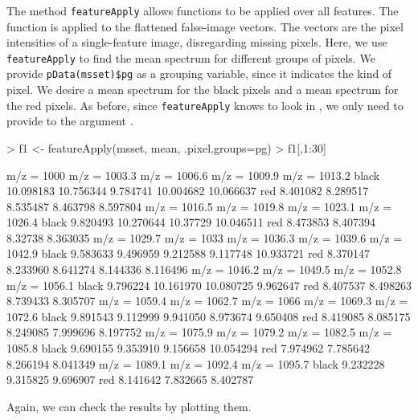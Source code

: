 \documentclass[a4paper]{article}
\begin{document}
\subsubsection{}

The method \verb|featureApply| allows functions to be applied over all features. The function is applied to the flattened false-image vectors. The vectors are the pixel intensities of a single-feature image, disregarding missing pixels. Here, we use \verb|featureApply| to find the mean spectrum for different groups of pixels. We provide \verb|pData(msset)$pg| as a grouping variable, since it indicates the kind of pixel. We desire a mean spectrum for the black pixels and a mean spectrum for the red pixels. As before, since \verb|featureApply| knows to look in , we only need to provide  to the argument .
\begin{Schunk}
\begin{Sinput}
> f1 <- featureApply(msset, mean, .pixel.groups=pg)
> f1[,1:30]
\end{Sinput}
\begin{Soutput}
      m/z = 1000 m/z = 1003.3 m/z = 1006.6 m/z = 1009.9 m/z = 1013.2
black  10.098183    10.756344     9.784741    10.004682    10.066637
red     8.401082     8.289517     8.535487     8.463798     8.597804
      m/z = 1016.5 m/z = 1019.8 m/z = 1023.1 m/z = 1026.4
black     9.820493    10.270644     10.37729    10.046511
red       8.473853     8.407394      8.32738     8.363035
      m/z = 1029.7 m/z = 1033 m/z = 1036.3 m/z = 1039.6 m/z = 1042.9
black     9.583633   9.496959     9.212588     9.117748    10.933721
red       8.370147   8.233960     8.641274     8.144336     8.116496
      m/z = 1046.2 m/z = 1049.5 m/z = 1052.8 m/z = 1056.1
black     9.796224    10.161970    10.080725     9.962647
red       8.407537     8.498263     8.739433     8.305707
      m/z = 1059.4 m/z = 1062.7 m/z = 1066 m/z = 1069.3 m/z = 1072.6
black     9.891543     9.112999   9.941050     8.973674     9.650408
red       8.419085     8.085175   8.249085     7.999696     8.197752
      m/z = 1075.9 m/z = 1079.2 m/z = 1082.5 m/z = 1085.8
black     9.690155     9.353910     9.156658    10.054294
red       7.974962     7.785642     8.266194     8.041349
      m/z = 1089.1 m/z = 1092.4 m/z = 1095.7
black     9.232228     9.315825     9.696907
red       8.141642     7.832665     8.402787
\end{Soutput}
\end{Schunk}
Again, we can check the results by plotting them.
\end{document}
